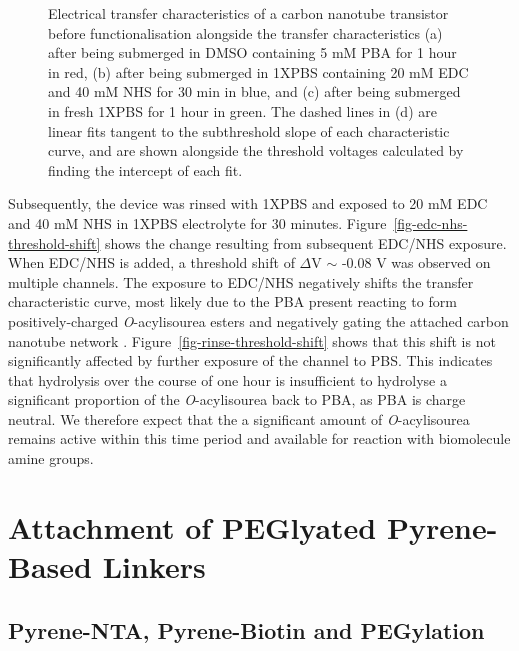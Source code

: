 \documentclass[
  a4paper,
]{scrbook}
\begin{document}
\begin{figure}
\begin{minipage}[t]{0.50\linewidth}
{{}

}

\subcaption{\label{fig-pba-threshold-shift-comparison}}
\end{minipage}%

\caption{\label{fig-pba-functionalisation-threshold-shift}Electrical
transfer characteristics of a carbon nanotube transistor before
functionalisation alongside the transfer characteristics (a) after being
submerged in DMSO containing 5 mM PBA for 1 hour in red, (b) after being
submerged in 1XPBS containing 20 mM EDC and 40 mM NHS for 30 min in
blue, and (c) after being submerged in fresh 1XPBS for 1 hour in green.
The dashed lines in (d) are linear fits tangent to the subthreshold
slope of each characteristic curve, and are shown alongside the
threshold voltages calculated by finding the intercept of each fit.}

\end{figure}

Subsequently, the device was rinsed with 1XPBS and exposed to 20 mM EDC
and 40 mM NHS in 1XPBS electrolyte for 30 minutes.
Figure~\ref{fig-edc-nhs-threshold-shift} shows the change resulting from
subsequent EDC/NHS exposure. When EDC/NHS is added, a threshold shift of
\(\Delta\)V \(\sim\) -0.08 V was observed on multiple channels. The
exposure to EDC/NHS negatively shifts the transfer characteristic curve,
most likely due to the PBA present reacting to form positively-charged
\emph{O}-acylisourea esters and negatively gating the attached carbon
nanotube network \autocite{Heller2008,Hermanson2013-4}.
Figure~\ref{fig-rinse-threshold-shift} shows that this shift is not
significantly affected by further exposure of the channel to PBS. This
indicates that hydrolysis over the course of one hour is insufficient to
hydrolyse a significant proportion of the \emph{O}-acylisourea back to
PBA, as PBA is charge neutral. We therefore expect that the a
significant amount of \emph{O}-acylisourea remains active within this
time period and available for reaction with biomolecule amine groups.

\hypertarget{attachment-of-peglyated-pyrene-based-linkers}{%
\section{Attachment of PEGlyated Pyrene-Based
Linkers}\label{attachment-of-peglyated-pyrene-based-linkers}}

\hypertarget{sec-NTA-biotin-PEG}{%
\subsection{Pyrene-NTA, Pyrene-Biotin and
PEGylation}\label{sec-NTA-biotin-PEG}}
\end{document}
